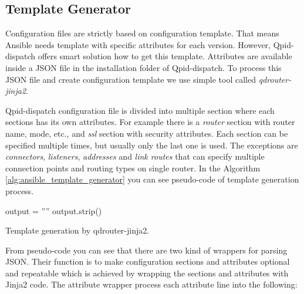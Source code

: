 
\subsection{Template Generator}
Configuration files are strictly based on configuration template. That means Ansible needs template with specific attributes for each version. However, Qpid-dispatch offers smart solution how to get this template. Attributes are available inside a JSON file in the installation folder of Qpid-dispatch. To process this JSON file and create configuration template we use simple tool called \emph{qdrouter-jinja2}\footnotemark{}.


Qpid-dispatch configuration file is divided into multiple section where each sections has its own attributes. For example there is a \emph{router} section with router name, mode, etc., and \emph{ssl} section with security attributes. Each section can be specified multiple times, but usually only the last one is used. The exceptions are \emph{connectors}, \emph{listeners}, \emph{addresses} and \emph{link routes} that can specify multiple connection points and routing types on single router. In the Algorithm \ref{alg:ansible_template_generator} you can see pseudo-code of template generation process.

\begin{center}
	\begin{algorithm}[H]
		\LinesNumbered
		\DontPrintSemicolon


		\var output = ''''\;
		output.strip()\;
		\caption{Template generation by qdrouter-jinja2.}
		\label{alg:ansible_template_generator}
	\end{algorithm}
\end{center}

From pseudo-code you can see that there are two kind of wrappers for parsing JSON. Their function is to make configuration sections and attributes optional and repeatable which is achieved by wrapping the sections and attributes with Jinja2 code. The attribute wrapper process each attribute line into the following:


